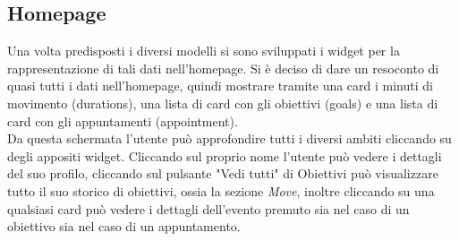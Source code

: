 \subsection{Homepage}
Una volta predisposti i diversi modelli si sono sviluppati i widget per la rappresentazione di tali dati nell'homepage. Si è deciso di dare un resoconto di quasi tutti i dati nell'homepage, quindi mostrare tramite una card i minuti di movimento (durations), una lista di card con gli obiettivi (goals) e una lista di card con gli appuntamenti (appointment). \\
Da questa schermata l'utente può approfondire tutti i diversi ambiti cliccando su degli appositi widget. Cliccando sul proprio nome l'utente può vedere i dettagli del suo profilo, cliccando sul pulsante "Vedi tutti" di Obiettivi può visualizzare tutto il suo storico di obiettivi, ossia la sezione \textit{Move}, inoltre cliccando su una qualsiasi card può vedere i dettagli dell'evento premuto sia nel caso di un obiettivo sia nel caso di un appuntamento.
